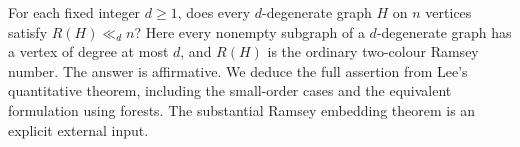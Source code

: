 For each fixed integer $d\geq1$, does every $d$-degenerate graph $H$
on $n$ vertices satisfy $R(H)\ll_d n$? Here every nonempty subgraph
of a $d$-degenerate graph has a vertex of degree at most $d$, and $R(H)$
is the ordinary two-colour Ramsey number. The answer is affirmative.
We deduce the full assertion from Lee's quantitative theorem, including
the small-order cases and the equivalent formulation using forests.
The substantial Ramsey embedding theorem is an explicit external input.
